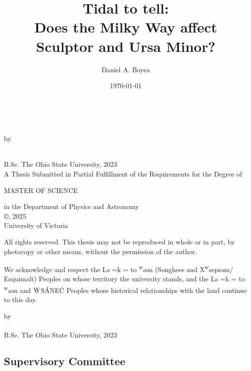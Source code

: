 \documentclass[12pt,oneside,letterpaper]{report}
\title{Tidal to tell: \\
    Does the Milky Way affect Sculptor and Ursa Minor?
}
\author{Daniel A. Boyea}
\date{\today}
\newcommand{\schwa}{ə}
\newcommand{\Lekwnen}{L\schwa{}\overcomma{k}\textsuperscript{w}\schwa{}\ng{}\schwa{}n}
\newcommand{\skipline}{\vspace{\baselineskip}}
\def\overcomma#1{%
  \setbox0=\hbox{#1}%
  \dimen0=\wd0       %
  \vbox{%
    \hbox to \dimen0{\hfil,\hfil}%
    \nointerlineskip            %
    \box0                       %
  }%
}
\begin{document}


\makeatletter
\begin{titlepage}
   \begin{center}
       \textbf{\@title}\\
        \skipline

        by\\
        \skipline

       \@author\\
       B.Sc. The Ohio State University, 2023\\
       \vspace*{3\baselineskip}
    A Thesis Submitted in Partial Fulfillment of the Requirements for the Degree of\\
    \skipline

    MASTER OF SCIENCE \\
    \skipline

    in the Department of Physics and Astronomy\\
       \vfill
       ©\@author, 2025\\
       University of Victoria\\
       \vspace*{3\baselineskip}

       All rights reserved. This thesis may not be reproduced in whole or in part,
by photocopy or other means, without the permission of the author. \\
\skipline
   \end{center}
We acknowledge and respect the \Lekwnen{} (Songhees and X\textsuperscript{w}seps\schwa{}m/
Esquimalt) Peoples on whose territory the university stands, and the
\Lekwnen{} and ${\underaccent{\bar}{\rm W}}$S\'ANE\'C Peoples whose historical relationships with the
land continue to this day. 
\end{titlepage}

\addtocounter{page}{1}


\begin{centering}
\textbf{\@title}
\skipline
by\\
\skipline
\@author\\
B.Sc. The Ohio State University, 2023\\
\vspace*{3\baselineskip}
\end{centering}

\subsection*{Supervisory Committee}
\end{document}
